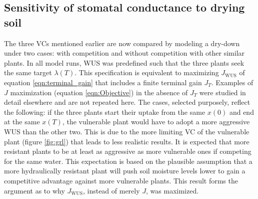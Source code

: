 \documentclass[utf8]{frontiersSCNS} %
\begin{document}



\subsection{Sensitivity of stomatal conductance to drying soil}

The three VCs mentioned earlier are now compared by modeling a dry-down under two cases: with competition and without competition with other similar plants. In all model runs, WUS was predefined such that the three plants seek the same target $\lambda(T)$. This specification is equivalent to maximizing $J_{\text{WUS}}$ of equation \ref{eqn:terminal_gain} that includes a finite terminal gain $J_T$. Examples of $J$ maximization (equation \ref{eqn:Objective}) in the absence of $J_T$ were studied in detail elsewhere \citep{manzoni_optimization_2013} and are not repeated here. The cases, selected purposely, reflect the following: if the three plants start their uptake from the same $x(0)$ and end at the same $x(T)$, the vulnerable plant would have to adopt a more aggressive WUS than the other two. This is due to the more limiting VC of the vulnerable plant (figure \ref{fig:grl}) that leads to less realistic results. It is expected that more resistant plants to be at least as aggressive as more vulnerable ones if competing for the same water. This expectation is based on the plausible assumption that a more hydraulically resistant plant will push soil moisture levels lower to gain a competitive advantage against more vulnerable plants. This result forms the argument as to why $J_{\text{WUS}}$, instead of merely $J$, was maximized.
\end{document}
